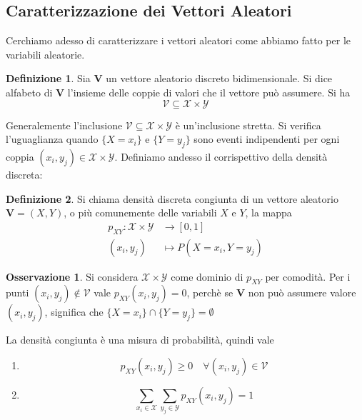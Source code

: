 \documentclass{article}
\theoremstyle{plain}
\theoremstyle{definition}
\newtheorem{definizione}{Definizione}[section]
\newtheorem{osservazione}{Osservazione}[section]
\theoremstyle{remark}
\begin{document}
\subsection{Caratterizzazione dei Vettori Aleatori} %
\label{sub:caratterizzazione_dei_vettori_aleatori}
Cerchiamo adesso di caratterizzare i vettori aleatori come abbiamo fatto per le variabili aleatorie.
\begin{definizione}
	Sia $\bm{V}$ un vettore aleatorio discreto bidimensionale. Si dice alfabeto di $\bm{V}$ l'insieme delle coppie di valori che il vettore può assumere. Si ha
	\begin{equation*}
		\mathcal{V}\subseteq\mathcal{X}\times\mathcal{Y}
	\end{equation*}
\end{definizione}
Generalemente l'inclusione $\mathcal{V}\subseteq\mathcal{X}\times\mathcal{Y}$ è un'inclusione stretta. Si verifica l'uguaglianza quando $\{X=x_i\}$ e $\{Y=y_j\}$ sono eventi indipendenti per ogni coppia $(x_i,y_j)\in\mathcal{X}\times\mathcal{Y}$. Definiamo andesso il corrispettivo della densità discreta:
\begin{definizione}
	Si chiama densità discreta congiunta di un vettore aleatorio $\bm{V}=(X,Y)$, o più comunemente delle variabili $X$ e $Y$, la mappa
	\begin{align*}
		p_{XY}:\mathcal{X}\times\mathcal{Y}&\to[0,1]\\
		(x_i,y_j)&\mapsto P(X=x_i,Y=y_j)
	\end{align*}
\end{definizione}
\begin{osservazione}
	Si considera $\mathcal{X}\times\mathcal{Y}$ come dominio di $p_{XY}$ per comodità. Per i punti $(x_i,y_j)\notin\mathcal{V}$ vale $p_{XY}(x_i,y_j)=0$, perchè se $\bm{V}$ non può assumere valore $(x_i,y_j)$, significa che $\{X=x_i\}\cap\{Y=y_j\}=\emptyset$
\end{osservazione}
La densità congiunta è una misura di probabilità, quindi vale
\begin{enumerate}
	\item
	\begin{equation*}
		p_{XY}(x_i , y_j)\geq0\quad\forall(x_i , y_j)\in\mathcal{V}
	\end{equation*}
	\item 
	\begin{equation*}
		\sum_{x_i\in\mathcal{X}}\sum_{y_j\in\mathcal{Y}}p_{XY}(x_i,y_j)=1
	\end{equation*}
\end{enumerate}
\end{document}
